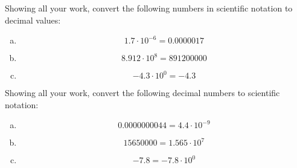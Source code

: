 \documentclass[12pt,letterpaper]{exam}
\begin{document}
\begin{questions}
\newpage
\question Showing all your work, convert the following numbers in scientific notation to decimal values:
	 \pspace

\sol
\begin{enumerate}[(a)]
\item 
	\[
	1.7 \cdot 10^{-6}= 0.0000017
	\] \pspace

\item 
	\[
	8.912 \cdot 10^8= 891200000
	\] \pspace

\item 
	\[
	-4.3 \cdot 10^0= -4.3
	\]
\end{enumerate}



\newpage
\question Showing all your work, convert the following decimal numbers to scientific notation: 
	 \pspace

\sol
\begin{enumerate}[(a)]
\item 
	\[
	0.0000000044= 4.4 \cdot 10^{-9}
	\] \pspace

\item 
	\[
	15650000= 1.565 \cdot 10^7
	\] \pspace

\item 
	\[
	-7.8= -7.8 \cdot 10^0
	\]
\end{enumerate}




\end{questions}
\end{document}
